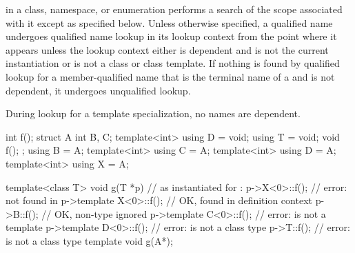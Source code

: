 \pnum
{}
in a class, namespace, or enumeration performs
a search of the scope associated with it
except as specified below.
Unless otherwise specified,
a qualified name undergoes qualified name lookup in its lookup context
from the point where it appears
unless the lookup context either
is dependent and is not the current instantiation or
is not a class or class template.
If nothing is found by qualified lookup for a member-qualified name
that is the terminal name of
a  and
is not dependent, it undergoes unqualified lookup.
\begin{note}
During lookup for a template specialization, no names are dependent.
\end{note}
\begin{example}
\begin{codeblock}
int f();
struct A {
  int B, C;
  template<int> using D = void;
  using T = void;
  void f();
};
using B = A;
template<int> using C = A;
template<int> using D = A;
template<int> using X = A;

template<class T>
void g(T *p) {                  // as instantiated for :
  p->X<0>::f();                 // error:  not found in 
  p->template X<0>::f();        // OK,  found in definition context
  p->B::f();                    // OK, non-type  ignored
  p->template C<0>::f();        // error:  is not a template
  p->template D<0>::f();        // error:  is not a class type
  p->T::f();                    // error:  is not a class type
}
template void g(A*);
\end{codeblock}
\end{example}

